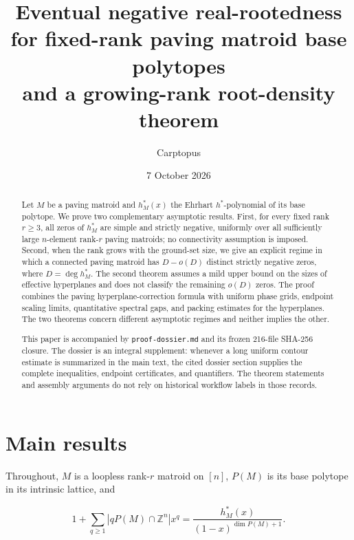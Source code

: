 \documentclass[10pt]{article}
\title{Eventual negative real-rootedness for fixed-rank paving matroid base polytopes\\
and a growing-rank root-density theorem}
\author{Carptopus}
\date{7 October 2026}
\begin{document}
\maketitle
\begin{center}
\end{center}

\begin{abstract}


Let $M$ be a paving matroid and $h_M^*(x)$ the Ehrhart $h^*$-polynomial
of its base polytope.  We prove two complementary asymptotic results.  First,
for every fixed rank $r\ge3$, all zeros of $h_M^*$ are simple and strictly
negative, uniformly over all sufficiently large $n$-element rank-$r$
paving matroids; no connectivity assumption is imposed.  Second, when the
rank grows with the ground-set size, we give an explicit regime in which a
connected paving matroid has $D-o(D)$ distinct strictly negative zeros,
where $D=\deg h_M^*$.  The second theorem assumes a mild upper bound on the
sizes of effective hyperplanes and does not classify the remaining $o(D)$
zeros.  The proof combines the paving hyperplane-correction formula with
uniform phase grids, endpoint scaling limits, quantitative spectral gaps, and
packing estimates for the hyperplanes.  The two theorems concern different
asymptotic regimes and neither implies the other.

This paper is accompanied by \texttt{proof-\allowbreak{}dossier.\allowbreak{}md} and its frozen 216-file
SHA-256 closure.  The dossier is an integral supplement: whenever a long
uniform contour estimate is summarized in the main text, the cited dossier
section supplies the complete inequalities, endpoint certificates, and
quantifiers.  The theorem statements and assembly arguments do not rely on
historical workflow labels in those records.

\end{abstract}

\section{Main results}


Throughout, $M$ is a loopless rank-$r$ matroid on $[n]$, $P(M)$ is its
base polytope in its intrinsic lattice, and

\[
 1+\sum_{q\ge1}|qP(M)\cap\mathbb Z^n|x^q
 =\frac{h_M^*(x)}{(1-x)^{\dim P(M)+1}}.
\]
\end{document}

